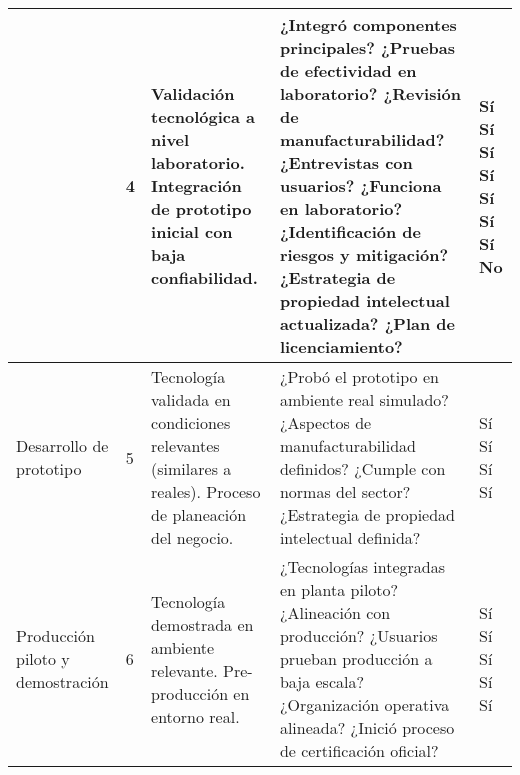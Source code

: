 \begin{longtable}{|p{2.5cm}|p{0.5cm}|p{4cm}|p{4cm}|p{1cm}|}
& 4 &
Validación tecnológica a nivel laboratorio. Integración de prototipo inicial con baja confiabilidad. &
¿Integró componentes principales? \newline
¿Pruebas de efectividad en laboratorio? \newline
¿Revisión de manufacturabilidad? \newline
¿Entrevistas con usuarios? \newline
¿Funciona en laboratorio? \newline
¿Identificación de riesgos y mitigación? \newline
¿Estrategia de propiedad intelectual actualizada? \newline
¿Plan de licenciamiento? &
Sí \newline Sí \newline Sí \newline Sí \newline Sí \newline Sí \newline Sí \newline No \\
\hline

Desarrollo de prototipo & 5 &
Tecnología validada en condiciones relevantes (similares a reales). Proceso de planeación del negocio. &
¿Probó el prototipo en ambiente real simulado? \newline
¿Aspectos de manufacturabilidad definidos? \newline
¿Cumple con normas del sector? \newline
¿Estrategia de propiedad intelectual definida? &
Sí \newline Sí \newline Sí \newline Sí \\
\hline

Producción piloto y demostración & 6 &
Tecnología demostrada en ambiente relevante. Pre-producción en entorno real. &
¿Tecnologías integradas en planta piloto? \newline
¿Alineación con producción? \newline
¿Usuarios prueban producción a baja escala? \newline
¿Organización operativa alineada? \newline
¿Inició proceso de certificación oficial? &
Sí \newline Sí \newline Sí \newline Sí \newline Sí \\
\hline


\end{longtable}
